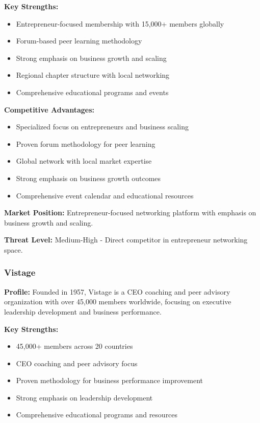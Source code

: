 \textbf{Key Strengths:}
\begin{itemize}
    \item Entrepreneur-focused membership with 15,000+ members globally
    \item Forum-based peer learning methodology
    \item Strong emphasis on business growth and scaling
    \item Regional chapter structure with local networking
    \item Comprehensive educational programs and events
\end{itemize}

\textbf{Competitive Advantages:}
\begin{itemize}
    \item Specialized focus on entrepreneurs and business scaling
    \item Proven forum methodology for peer learning
    \item Global network with local market expertise
    \item Strong emphasis on business growth outcomes
    \item Comprehensive event calendar and educational resources
\end{itemize}

\textbf{Market Position:} Entrepreneur-focused networking platform with emphasis on business growth and scaling.

\textbf{Threat Level:} Medium-High - Direct competitor in entrepreneur networking space.

\subsubsection{Vistage}
\textbf{Profile:} Founded in 1957, Vistage is a CEO coaching and peer advisory organization with over 45,000 members worldwide, focusing on executive leadership development and business performance.

\textbf{Key Strengths:}
\begin{itemize}
    \item 45,000+ members across 20 countries
    \item CEO coaching and peer advisory focus
    \item Proven methodology for business performance improvement
    \item Strong emphasis on leadership development
    \item Comprehensive educational programs and resources
\end{itemize}

